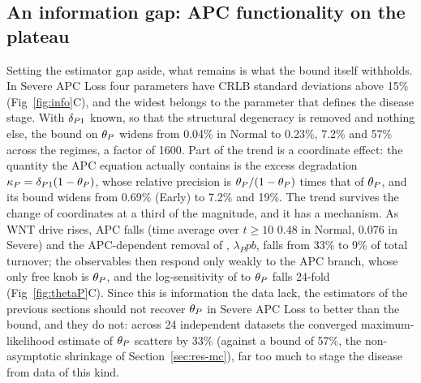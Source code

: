 \subsection{An information gap: APC functionality on the \texorpdfstring{\bcat{}}{beta-catenin} plateau}
\label{sec:res-thetaP}

Setting the estimator gap aside, what remains is what the bound itself
withholds.
In Severe APC Loss four parameters have CRLB standard deviations above 15\%
(Fig~\ref{fig:info}C), and the widest belongs to the parameter that defines the
disease stage. With $\delta_{P1}$ known, so that the structural degeneracy is removed
and nothing else, the bound on $\theta_P$ widens from 0.04\% in Normal to 0.23\%,
7.2\% and 57\% across the regimes, a factor of 1600. Part of the trend is a
coordinate effect: the quantity the APC equation actually contains is the
excess degradation $\kappa_P=\delta_{P1}(1-\theta_P)$, whose relative precision is
$\theta_P/(1-\theta_P)$ times that of $\theta_P$, and its bound widens from 0.69\% (Early)
to 7.2\% and 19\%. The trend survives the change of coordinates at a third of
the magnitude, and it has a mechanism. As WNT drive rises, APC falls (time
average over $t\ge10$ 0.48 in Normal, 0.076 in Severe) and the APC-dependent removal of
\bcat{}, $\lambda_P p b$, falls from 33\% to 9\% of total \bcat{} turnover; the
observables then respond only weakly to the APC branch, whose only free knob is
$\theta_P$, and the log-sensitivity of \bcat{} to $\theta_P$ falls 24-fold
(Fig~\ref{fig:thetaP}C). Since this is information the data lack, the
estimators of the previous sections should not recover $\theta_P$ in Severe APC
Loss to better than the bound, and they do not: across 24 independent datasets
the converged maximum-likelihood estimate of $\theta_P$ scatters by 33\% (against a
bound of 57\%, the non-asymptotic shrinkage of Section~\ref{sec:res-mc}), far
too much to stage the disease from data of this kind.

